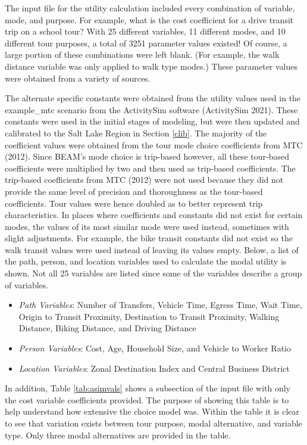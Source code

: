 \documentclass[12pt, oneside, openright]{byuthesis}
\providecommand{\tightlist}{%
  \setlength{\itemsep}{0pt}\setlength{\parskip}{0pt}}
\begin{document}
The input file for the utility calculation included every combination of variable, mode, and purpose. For example, what is the cost coefficient for a drive transit trip on a school tour? With 25 different variables, 11 different modes, and 10 different tour purposes, a total of 3251 parameter values existed! Of course, a large portion of these combinations were left blank. (For example, the walk distance variable was only applied to walk type modes.) These parameter values were obtained from a variety of sources.

The alternate specific constants were obtained from the utility values used in the example\_mtc scenario from the ActivitySim software (ActivitySim 2021). These constants were used in the initial stages of modeling, but were then updated and calibrated to the Salt Lake Region in Section \ref{clib}. The majority of the coefficient values were obtained from the tour mode choice coefficients from MTC (2012). Since BEAM's mode choice is trip-based however, all these tour-based coefficients were multiplied by two and then used as trip-based coefficients. The trip-based coefficients from MTC (2012) were not used because they did not provide the same level of precision and thoroughness as the tour-based coefficients. Tour values were hence doubled as to better represent trip characteristics. In places where coefficients and constants did not exist for certain modes, the values of its most similar mode were used instead, sometimes with slight adjustments. For example, the bike transit constants did not exist so the walk transit values were used instead of leaving its values empty. Below, a list of the path, person, and location variables used to calculate the modal utility is shown. Not all 25 variables are listed since some of the variables describe a group of variables.

\begin{itemize}
\tightlist
\item
  \emph{Path Variables}: Number of Transfers, Vehicle Time, Egress Time, Wait Time, Origin to Transit Proximity, Destination to Transit Proximity, Walking Distance, Biking Distance, and Driving Distance
\item
  \emph{Person Variables}: Cost, Age, Household Size, and Vehicle to Worker Ratio
\item
  \emph{Location Variables}: Zonal Destination Index and Central Business District
\end{itemize}

In addition, Table \ref{tab:asimvals} shows a subsection of the input file with only the cost variable coefficients provided. The purpose of showing this table is to help understand how extensive the choice model was. Within the table it is clear to see that variation exists between tour purpose, modal alternative, and variable type. Only three modal alternatives are provided in the table.
\end{document}

